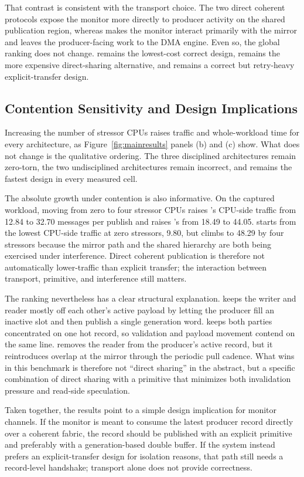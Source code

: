 That contrast is consistent with the transport choice. The two direct
coherent protocols expose the monitor more directly to producer activity
on the shared publication region, whereas \dmaseqlock makes the monitor
interact primarily with the mirror and leaves the producer-facing work
to the DMA engine. Even so, the global ranking does not change.
\dblbuf remains the lowest-cost correct design, \seqlock remains the
more expensive direct-sharing alternative, and \dmaseqlock remains a
correct but retry-heavy explicit-transfer design.

\subsection{Contention Sensitivity and Design Implications}

Increasing the number of stressor CPUs raises traffic and whole-workload
time for every architecture, as Figure~\ref{fig:mainresults} panels (b)
and (c) show. What does not change is the qualitative ordering. The
three disciplined architectures remain zero-torn, the two undisciplined
architectures remain incorrect, and \dblbuf remains the fastest design
in every measured cell.

The absolute growth under contention is also informative. On the
captured workload, moving from zero to four stressor CPUs raises
\dblbuf's CPU-side traffic from 12.84 to 32.70 messages per publish and
raises \seqlock's from 18.49 to 44.05. \dmaseqlock starts from the
lowest CPU-side traffic at zero stressors, 9.80, but climbs to 48.29 by
four stressors because the mirror path and the shared hierarchy are both
being exercised under interference. Direct coherent publication is
therefore not automatically lower-traffic than explicit transfer; the
interaction between transport, primitive, and interference still
matters.

The ranking nevertheless has a clear structural explanation. \dblbuf
keeps the writer and reader mostly off each other's active payload by
letting the producer fill an inactive slot and then publish a single
generation word. \seqlock keeps both parties concentrated on one hot
record, so validation and payload movement contend on the same line.
\dmaseqlock removes the reader from the producer's active record, but it
reintroduces overlap at the mirror through the periodic pull cadence.
What wins in this benchmark is therefore not ``direct sharing'' in the
abstract, but a specific combination of direct sharing with a primitive
that minimizes both invalidation pressure and read-side speculation.

Taken together, the results point to a simple design implication for
\CPS monitor channels. If the monitor is meant to consume the latest
producer record directly over a coherent fabric, the record should be
published with an explicit primitive and preferably with a
generation-based double buffer. If the system instead prefers an
explicit-transfer design for isolation reasons, that path still needs a
record-level handshake; transport alone does not provide correctness.
